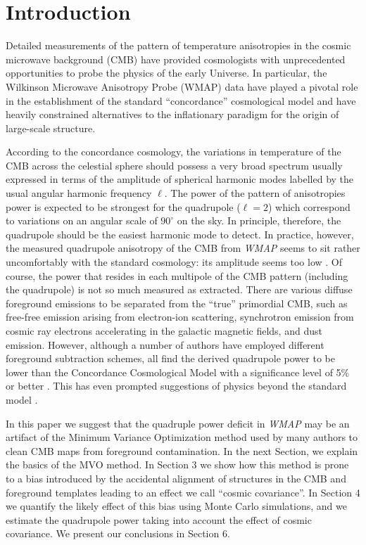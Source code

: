 \documentclass{emulateapj}
\def\wmap{{\sl WMAP }}
\def\l{{\ell}}
\begin{document}
\section{Introduction}

Detailed measurements of the pattern of temperature anisotropies in
the cosmic microwave background (CMB) have provided cosmologists
with unprecedented opportunities to probe the physics of the early
Universe. In particular, the Wilkinson Microwave Anisotropy Probe
(WMAP) data \citep{wmapresults,wmapfg,wmapcl,wmap3ytem} have played
a pivotal role in the establishment of the standard ``concordance''
cosmological model and have heavily constrained alternatives to the
inflationary paradigm for the origin of large-scale structure.

According to the concordance cosmology, the variations in
temperature of the CMB across the celestial sphere should possess a
very broad spectrum usually expressed in terms of the amplitude of
spherical harmonic modes labelled by the usual angular harmonic
frequency $\l$. The power of the pattern of anisotropies power is
expected to be strongest for the quadrupole ($\l=2$) which
correspond to variations on an angular scale of  $90^\circ$ on the
sky. In principle, therefore, the quadrupole should be the easiest
harmonic mode to detect. In practice, however, the measured
quadrupole anisotropy of the CMB from \wmap seems to sit rather
uncomfortably with the standard cosmology: its amplitude seems too
low \citep{efssig,dtzh}. Of course, the power that resides in each multipole of the CMB
pattern (including the quadrupole) is not so much measured as
extracted. There are various diffuse foreground emissions to be
separated from the ``true'' primordial CMB, such as free-free
emission arising from electron-ion scattering, synchrotron emission
from cosmic ray electrons accelerating in the galactic magnetic
fields, and dust emission. However, although a number of authors
have  employed different foreground subtraction schemes, all find
the derived quadrupole power to be lower than the Concordance
Cosmological Model with a significance level of 5\% or better
\citep{efssig,lilc,dt,park3y,saha}. This has even prompted suggestions of
physics beyond the standard model \citep{efsspacurv,dodecahedral}.

In this paper we suggest that the quadruple power deficit in \wmap
may be an artifact of the Minimum Variance Optimization method
used by many authors to clean CMB maps from foreground
contamination. In the next Section, we explain the basics of the MVO
method. In Section 3 we show how this method is prone to a bias
introduced by the accidental alignment of structures in the CMB and
foreground templates leading to an effect we call ``cosmic
covariance''. In Section 4 we quantify the likely effect of this
bias using Monte Carlo simulations, and we estimate the quadrupole power taking into account the effect of cosmic covariance. We present our
conclusions in Section 6.
\end{document}
